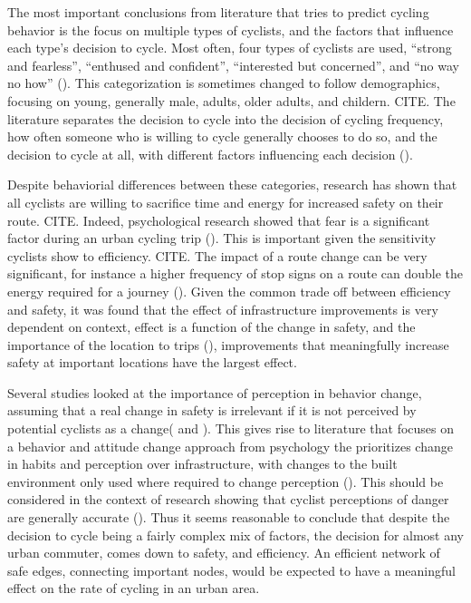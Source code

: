 \documentclass[11pt]{article} %
\begin{document}
The most important conclusions from literature that tries to predict cycling behavior is the focus on multiple types of cyclists, and the factors that influence each type's decision to cycle. Most often, four types of cyclists are used, ``strong and fearless'', ``enthused and confident'', ``interested but concerned'', and ``no way no how'' (\cite{dill2013four}). This categorization is sometimes changed to follow demographics, focusing on young, generally male, adults, older adults, and childern. CITE. The literature separates the decision to cycle into the decision of cycling frequency, how often someone who is willing to cycle generally chooses to do so, and the decision to cycle at all, with different factors influencing each decision (\cite{stinson2005comparison}). 

Despite behaviorial differences between these categories, research has shown that all cyclists are willing to sacrifice time and energy for increased safety on their route. CITE. Indeed, psychological research showed that fear is a significant factor during an urban cycling trip (\cite{ellett2018state}). This is important given the sensitivity cyclists show to efficiency. CITE. The impact of a route change can be very significant, for instance a higher frequency of stop signs on a route can double the energy required for a journey (\cite{fajans2001bicyclists}). Given the common trade off between efficiency and safety, it was found that the effect of infrastructure improvements is very dependent on context, effect is a function of the change in safety, and the importance of the location to trips (\cite{kondo2018bike}), improvements that meaningfully increase safety at important locations have the largest effect. 

Several studies looked at the importance of perception in behavior change, assuming that a real change in safety is irrelevant if it is not perceived by potential cyclists as a change(\cite{li2012physical} and \cite{parkin2007models}). This gives rise to literature that focuses on a behavior and attitude change approach from psychology the prioritizes change in habits and perception over infrastructure, with changes to the built environment only used where required to change perception (\cite{savan2017integrated}). This should be considered in the context of research showing that cyclist perceptions of danger are generally accurate (\cite{vandenbulcke2014predicting}). Thus it seems reasonable to conclude that despite the decision to cycle being a fairly complex mix of factors, the decision for almost any urban commuter, comes down to safety, and efficiency. An efficient network of safe edges, connecting important nodes, would be expected to have a meaningful effect on the rate of cycling in an urban area.  
\end{document}
